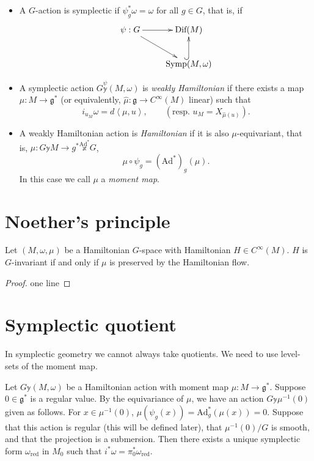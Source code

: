 \begin{definition}
\label{definition-symplectic-and-hamiltonian-actions}
\begin{itemize}
\item A $G$-action is symplectic if $\psi_g^*\omega=\omega$ for all $g \in G$,
that is, if
$$
\xymatrix{
\psi:G\ar[r]\ar[dr]&\text{Dif}(M)\\
&\text{Symp}(M,\omega)\ar@{^{(}->}[u].
}
$$

\item A symplectic action $G \overset{\psi}{\mathbb{y}}(M,\omega)$
is {\it weakly Hamiltonian} if there exists a map $\mu:M \to \mathfrak{g}^*$ 
(or equivalently, $\hat{\mu}:\mathfrak{g} \to C^\infty(M)$ linear)
such that
$$
i_{u_M}\omega=d\left<\mu,u\right>,\qquad (\text{resp. } u_M=X_{\hat{\mu}(u)}).
$$

\item A weakly Hamiltonian action is {\it Hamiltonian} if it is also
$\mu$-equivariant, that is,
$\mu: G\mathbb{y} M \to g^*\overset{\text{Ad}^*}{\mathbb{x}}G$,
$$
\mu \circ \psi_g=(\text{Ad}^*)_g(\mu).
$$
In this case we call $\mu$ a {\it moment map}.
\end{itemize}

\end{definition}

\section{Noether's principle}
\label{section-Noether-principle}

\begin{theorem}
\label{theorem-Noether-principle}
Let $(M,\omega,\mu)$ be a Hamiltonian $G$-space with Hamiltonian
$H\in C^\infty(M)$. $H$ is $G$-invariant if and only if $\mu$ is preserved by
the Hamiltonian flow.
\end{theorem}

\begin{proof}
one line
\end{proof}

\section{Symplectic quotient}
\label{section-symplectic-quotient}

\noindent
In symplectic geometry we cannot always take quotients.
We need to use level-sets of the moment map.

\begin{theorem}
\label{theorem-marsden-weinstein-megre}
Let $G \mathbb{y} (M,\omega)$ be a Hamiltonian action
with moment map $\mu:M \to \mathfrak{g}^*$.
Suppose $0 \in \mathfrak{g}^*$ is a regular value.
By the equivariance of $\mu$, we have an action $G \mathbb{y} \mu^{-1}(0)$
given as follows. For $x \in \mu^{-1}(0)$, 
$\mu(\psi_g(x))=\text{Ad}_g^*(\mu(x))=0$.
Suppose that this action is regular (this will be defined later),
that $\mu^{-1}(0)/G$ is smooth, and that the projection is a submersion.
Then there exists a unique symplectic form $\omega_{\text{red}}$ in $M_0$ 
such that $i^*\omega=\pi_0^*\omega_{\text{red}}$.
\end{theorem}

